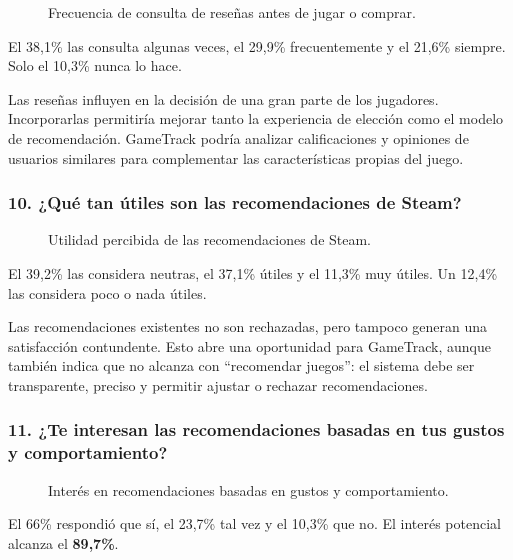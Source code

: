 \begin{figure}[H]
	\centering
	\caption{Frecuencia de consulta de reseñas antes de jugar o comprar.}
	\label{fig:enc-p09}
\end{figure}

El 38,1\% las consulta algunas veces, el 29,9\% frecuentemente y el 21,6\% siempre. Solo el 10,3\% nunca lo hace.

Las reseñas influyen en la decisión de una gran parte de los jugadores. Incorporarlas permitiría mejorar tanto la experiencia de elección como el modelo de recomendación. GameTrack podría analizar calificaciones y opiniones de usuarios similares para complementar las características propias del juego.

\subsubsection*{10. ¿Qué tan útiles son las recomendaciones de Steam?}

\begin{figure}[H]
	\centering
	\caption{Utilidad percibida de las recomendaciones de Steam.}
	\label{fig:enc-p10}
\end{figure}

El 39,2\% las considera neutras, el 37,1\% útiles y el 11,3\% muy útiles. Un 12,4\% las considera poco o nada útiles.

Las recomendaciones existentes no son rechazadas, pero tampoco generan una satisfacción contundente. Esto abre una oportunidad para GameTrack, aunque también indica que no alcanza con \enquote{recomendar juegos}: el sistema debe ser transparente, preciso y permitir ajustar o rechazar recomendaciones.

\subsubsection*{11. ¿Te interesan las recomendaciones basadas en tus gustos y comportamiento?}

\begin{figure}[H]
	\centering
	\caption{Interés en recomendaciones basadas en gustos y comportamiento.}
	\label{fig:enc-p11}
\end{figure}

El 66\% respondió que sí, el 23,7\% tal vez y el 10,3\% que no. El interés potencial alcanza el \textbf{89,7\%}.

